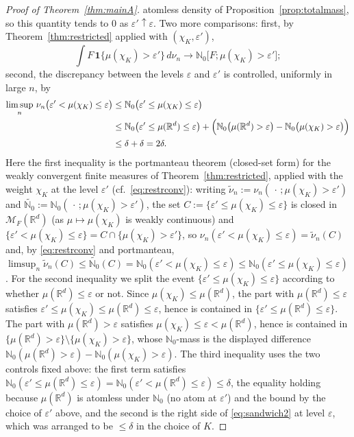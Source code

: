 \documentclass[11pt]{article}
\theoremstyle{definition}
\theoremstyle{remark}
\newcommand{\R}{\mathbb{R}}
\newcommand{\bN}{{\mathbb{N}_0}}                 %
\newcommand{\cM}{{\mathcal{M}_F(\R^d)}}          %
\newcommand{\eps}{\varepsilon}
\numberwithin{equation}{section}
\theoremstyle{plain}
\theoremstyle{definition}
\theoremstyle{remark}
\theoremstyle{plain}
\begin{document}
\begin{proof}[Proof of Theorem~\ref{thm:mainA}]
atomless density of Proposition~\ref{prop:totalmass}, so this quantity tends
to $0$ as $\eps'\uparrow\eps$. Two more comparisons:
first, by Theorem~\ref{thm:restricted} applied with $(\chi_K,\eps')$,
\begin{equation}\label{eq:restrconv}
\int F\,\mathbf 1\{\mu(\chi_K)>\eps'\}\,d\nu_n
\longrightarrow \bN\bigl[F;\mu(\chi_K)>\eps'\bigr];
\end{equation}
second, the discrepancy between the levels $\eps$ and $\eps'$ is
controlled, uniformly in large $n$, by
\begin{equation}\label{eq:levelgap}
\begin{aligned}
\limsup_n\,\nu_n\bigl(\eps'<\mu(\chi_K)\le\eps\bigr)
&\le\bN\bigl(\eps'\le\mu(\chi_K)\le\eps\bigr)\\
&\le\bN\bigl(\eps'\le\mu(\R^d)\le\eps\bigr)
+\Bigl(\bN\bigl(\mu(\R^d)>\eps\bigr)-\bN\bigl(\mu(\chi_K)>\eps\bigr)\Bigr)\\
&\le \delta+\delta=2\delta .
\end{aligned}
\end{equation}
Here the first inequality is the portmanteau theorem (closed-set form) for the
weakly convergent finite measures of Theorem~\ref{thm:restricted}, applied with the weight $\chi_K$ at the level $\eps'$ (cf.\ \eqref{eq:restrconv}): writing
$\widetilde\nu_n:=\nu_n(\,\cdot\,;\mu(\chi_K)>\eps')$ and
$\widetilde\bN:=\bN(\,\cdot\,;\mu(\chi_K)>\eps')$, the set
$C:=\{\eps'\le\mu(\chi_K)\le\eps\}$ is closed in $\cM$ (as $\mu\mapsto\mu(\chi_K)$
is weakly continuous) and $\{\eps'<\mu(\chi_K)\le\eps\}=C\cap\{\mu(\chi_K)>\eps'\}$,
so $\nu_n(\eps'<\mu(\chi_K)\le\eps)=\widetilde\nu_n(C)$ and, by
\eqref{eq:restrconv} and portmanteau,
$\limsup_n\widetilde\nu_n(C)\le\widetilde\bN(C)=\bN(\eps'<\mu(\chi_K)\le\eps)
\le\bN(\eps'\le\mu(\chi_K)\le\eps)$. For the second inequality we
split the event $\{\eps'\le\mu(\chi_K)\le\eps\}$ according to whether
$\mu(\R^d)\le\eps$ or not. Since $\mu(\chi_K)\le\mu(\R^d)$, the part with
$\mu(\R^d)\le\eps$ satisfies $\eps'\le\mu(\chi_K)\le\mu(\R^d)\le\eps$, hence is
contained in $\{\eps'\le\mu(\R^d)\le\eps\}$. The part with $\mu(\R^d)>\eps$
satisfies $\mu(\chi_K)\le\eps<\mu(\R^d)$, hence is contained in
$\{\mu(\R^d)>\eps\}\setminus\{\mu(\chi_K)>\eps\}$, whose $\bN$-mass is the
displayed difference $\bN(\mu(\R^d)>\eps)-\bN(\mu(\chi_K)>\eps)$. The third
inequality uses the two controls fixed above: the first term satisfies
$\bN(\eps'\le\mu(\R^d)\le\eps)=\bN(\eps'<\mu(\R^d)\le\eps)\le\delta$, the equality
holding because $\mu(\R^d)$ is atomless under $\bN$ (no atom at $\eps'$) and the
bound by the choice of $\eps'$ above, and the second is the right side of
\eqref{eq:sandwich2} at level $\eps$, which was arranged to be $\le\delta$ in
the choice of $K$.


\end{proof}
\end{document}
